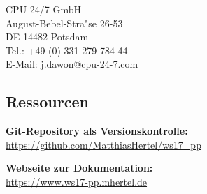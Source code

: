 \documentclass[12pt]{article}
\begin{document}
CPU 24/7 GmbH\\
August-Bebel-Stra"se 26-53\\
DE 14482 Potsdam\\

Tel.: +49 (0) 331 279 784 44\\
E-Mail: j.dawon@cpu-24-7.com

\subsection{Ressourcen}
\textbf{Git-Repository als Versionskontrolle:}\\
\url{https://github.com/MatthiasHertel/ws17_pp}

\textbf{Webseite zur Dokumentation:}\\
\url{https://www.ws17-pp.mhertel.de}



\clearpage
\setlength\bibitemsep{10pt}
\printbibliography[type=tech,heading=bibintoc, title=Verwendete Technologien]
\printbibliography[type=package,heading=bibintoc, title=Verwendete Go-Packages]
\newpage
{}
{}
\listoffigures
\newpage

%



\end{document}
